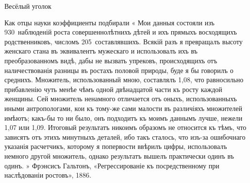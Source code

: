Весёлый уголок

Как отцы науки коэффициенты подбирали
«
Мои данныя состояли изъ 930~наблюденій роста совершеннолѣтнихъ дѣтей и ихъ прямыхъ восходящихъ родственниковъ, числомъ 205~составлявшихъ. Всякій разъ я превращалъ высоту женскаго стана въ эквивалентъ мужескаго и использовалъ ихъ въ преобразованномъ видѣ, дабы не вызвать упрековъ, происходящихъ отъ наличествованія разницы въ ростахъ половой природы, буде я бы говорилъ о среднихъ. Множитель, использованный мною, составлялъ 1,08, что равносильно прибавленію чуть менѣе чѣмъ одной двѣнадцатой части къ росту каждой женщины. Сей множитель ненамного отличается отъ оныхъ, использованныхъ иными антропологами, кои къ тому-же сами малости въ различіяхъ множителей имѣютъ; какъ-бы то ни было, онъ подходитъ къ моимъ даннымъ лучше, нежели 1,07 или 1,09. Итоговый результатъ никоимъ образомъ не относится къ тѣмъ, что зависятъ отъ этихъ минутныхъ деталей, ибо такъ сталось, что изъ-за ошибочнаго указанія расчетчикъ, которому я попервости ввѣрилъ цифры, использовалъ немного другой множитель, однако результатъ вышелъ практически одинъ въ одинъ. 
»
Фрэнсисъ Гальтонъ, «Регрессированіе къ посредственному при наслѣдованіи ростовъ», 1886.

